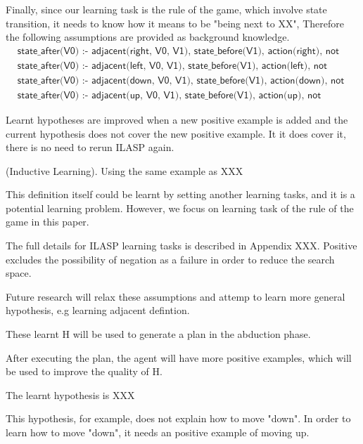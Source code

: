 Finally, since our learning task is the rule of the game, which involve state transition, it needs to know how it means to be "being next to XX",
Therefore the following assumptions are provided as background knowledge.
\begin{equation}
\begin{split}
&\textsf{state\_after(V0) :- adjacent(right, V0, V1), state\_before(V1), action(right), not wall(V0).}\\
&\textsf{state\_after(V0) :- adjacent(left, V0, V1), state\_before(V1), action(left), not wall(V0).}\\
&\textsf{state\_after(V0) :- adjacent(down, V0, V1), state\_before(V1), action(down), not wall(V0).}\\
&\textsf{state\_after(V0) :- adjacent(up, V0, V1), state\_before(V1), action(up), not wall(V0).}
\end{split}
\end{equation}

Learnt hypotheses are improved when a new positive example is added and the current hypothesis does not cover the new positive example.
It it does cover it, there is no need to rerun ILASP again. 

\begin{examp} \normalfont (Inductive Learning).
Using the same example as
XXX
\end{examp}

This definition itself could be learnt by setting another learning tasks, and it is a potential learning problem.
However, we focus on learning task of the rule of the game in this paper.

The full details for ILASP learning tasks is described in Appendix XXX.
Positive excludes the possibility of negation as a failure in order to reduce the search space.

Future research will relax these assumptions and attemp to learn more general hypothesis,
e.g learning adjacent defintion.

These learnt H will be used to generate a plan in the abduction phase.

After executing the plan, the agent will have more positive examples, which will be used to improve the quality of H.

The learnt hypothesis is XXX

This hypothesis, for example, does not explain how to move "down". In order to learn how to move "down", it needs an positive example of moving up.

